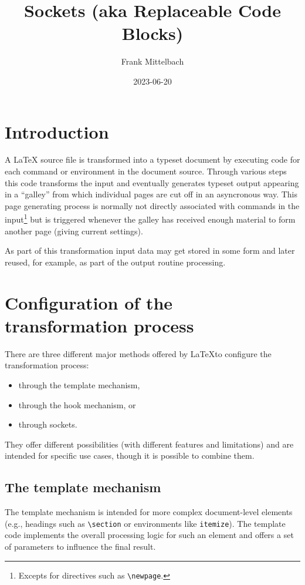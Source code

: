 \documentclass{article}
\newcommand\cs[1]{\texttt{\textbackslash #1}}
\begin{document}
\title{Sockets (aka Replaceable Code Blocks)}
\author{Frank Mittelbach}
\date{2023-06-20}

\maketitle

\tableofcontents

\section{Introduction}

A \LaTeX{} source file is transformed into a typeset document by
executing code for each command or environment in the document
source. Through various steps this code transforms the input and
eventually generates typeset output appearing in a \enquote{galley}
from which individual pages are cut off in an asyncronous way. This
page generating process is normally not directly associated with
commands in the input\footnote{Excepts for directives such as
  \cs{newpage}.} but is triggered whenever the galley has received
enough material to form another page (giving current settings).

As part of this transformation input data may get stored in some form
and later reused, for example, as part of the output routine
processing.

\section{Configuration of the transformation process}

There are three different major methods offered by \LaTeX to configure
the transformation process:
\begin{itemize}
\item through the template mechanism,
\item through the hook mechanism, or
\item through sockets.
\end{itemize}
They offer different possibilities (with different features and
limitations) and are intended for specific use cases, though it is
possible to combine them.

\subsection{The template mechanism}

The template mechanism is intended for more complex document-level
elements (e.g., headings such as \verb=\section= or environments like
\texttt{itemize}). The template code implements the overall processing
logic for such an element and offers a set of parameters to influence
the final result.
\end{document}
